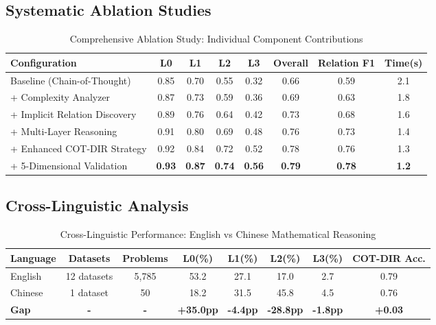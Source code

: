 \subsection{Systematic Ablation Studies}

\begin{table}[htbp]
\caption{Comprehensive Ablation Study: Individual Component Contributions}
\label{tab:detailed_ablation}
\centering
\small
\begin{tabular}{lccccccc}
\toprule
\textbf{Configuration} & \textbf{L0} & \textbf{L1} & \textbf{L2} & \textbf{L3} & \textbf{Overall} & \textbf{Relation F1} & \textbf{Time(s)} \\
\midrule
Baseline (Chain-of-Thought) & 0.85 & 0.70 & 0.55 & 0.32 & 0.66 & 0.59 & 2.1 \\
+ Complexity Analyzer & 0.87 & 0.73 & 0.59 & 0.36 & 0.69 & 0.63 & 1.8 \\
+ Implicit Relation Discovery & 0.89 & 0.76 & 0.64 & 0.42 & 0.73 & 0.68 & 1.6 \\
+ Multi-Layer Reasoning & 0.91 & 0.80 & 0.69 & 0.48 & 0.76 & 0.73 & 1.4 \\
+ Enhanced COT-DIR Strategy & 0.92 & 0.84 & 0.72 & 0.52 & 0.78 & 0.76 & 1.3 \\
+ 5-Dimensional Validation & \textbf{0.93} & \textbf{0.87} & \textbf{0.74} & \textbf{0.56} & \textbf{0.79} & \textbf{0.78} & \textbf{1.2} \\
\bottomrule
\end{tabular}
\end{table}

\subsection{Cross-Linguistic Analysis}

\begin{table}[htbp]
\caption{Cross-Linguistic Performance: English vs Chinese Mathematical Reasoning}
\label{tab:cross_linguistic}
\centering
\small
\begin{tabular}{lccccccc}
\toprule
\textbf{Language} & \textbf{Datasets} & \textbf{Problems} & \textbf{L0(\%)} & \textbf{L1(\%)} & \textbf{L2(\%)} & \textbf{L3(\%)} & \textbf{COT-DIR Acc.} \\
\midrule
English & 12 datasets & 5,785 & 53.2 & 27.1 & 17.0 & 2.7 & 0.79 \\
Chinese & 1 dataset & 50 & 18.2 & 31.5 & 45.8 & 4.5 & 0.76 \\
\midrule
\textbf{Gap} & \textbf{-} & \textbf{-} & \textbf{+35.0pp} & \textbf{-4.4pp} & \textbf{-28.8pp} & \textbf{-1.8pp} & \textbf{+0.03} \\
\bottomrule
\end{tabular}
\end{table}

